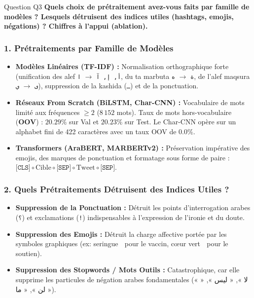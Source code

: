 \documentclass[11pt,a4paper]{article}
\begin{document}
\vspace{0.3cm}

\begin{questionbox}{Question Q3}
\textbf{Quels choix de prétraitement avez-vous faits par famille de modèles ? Lesquels détruisent des indices utiles (hashtags, emojis, négations) ? Chiffres à l'appui (ablation).}
\end{questionbox}

\subsubsection*{1. Prétraitements par Famille de Modèles}
\begin{itemize}[noitemsep]
    \item \textbf{Modèles Linéaires (TF-IDF) :} Normalisation orthographique forte (unification des alef \texttt{أ, إ, آ} $\to$ \texttt{ا}, du ta marbuta \texttt{ة} $\to$ \texttt{ه}, de l'alef maqsura \texttt{ى} $\to$ \texttt{ي}), suppression de la kashida (\texttt{ـ}) et de la ponctuation.
    \item \textbf{Réseaux From Scratch (BiLSTM, Char-CNN) :} Vocabulaire de mots limité aux fréquences $\ge 2$ ($8\,152$ mots). Taux de mots hors-vocabulaire (\textbf{OOV}) : $\mathbf{20.29\%}$ sur Val et $\mathbf{20.23\%}$ sur Test. Le Char-CNN opère sur un alphabet fini de 422 caractères avec un taux OOV de $\mathbf{0.0\%}$.
    \item \textbf{Transformers (AraBERT, MARBERTv2) :} Préservation impérative des emojis, des marques de ponctuation et formatage sous forme de paire : $\texttt{[CLS]} \circ \text{Cible} \circ \texttt{[SEP]} \circ \text{Tweet} \circ \texttt{[SEP]}$.
\end{itemize}

\subsubsection*{2. Quels Prétraitements Détruisent des Indices Utiles ?}
\begin{itemize}[noitemsep]
    \item \textbf{Suppression de la Ponctuation :} Détruit les points d'interrogation arabes (\texttt{؟}) et exclamations (\texttt{!}) indispensables à l'expression de l'ironie et du doute.
    \item \textbf{Suppression des Emojis :} Détruit la charge affective portée par les symboles graphiques (ex: seringue 💉 pour le vaccin, cœur vert 💚 pour le soutien).
    \item \textbf{Suppression des Stopwords / Mots Outils :} Catastrophique, car elle supprime les particules de négation arabes fondamentales (« لا », « ليس », « لن », « ما »).
\end{itemize}
\end{document}
